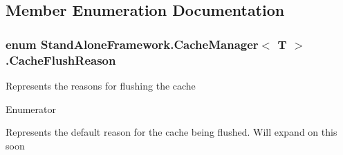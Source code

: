 \subsection{Member Enumeration Documentation}
\hypertarget{class_stand_alone_framework_1_1_cache_manager_3_01_t_01_4_ad524db310decad748ac932dfd557e529}{
\subsubsection[{Cache\+Flush\+Reason}]{\setlength{\rightskip}{0pt plus 5cm}enum Stand\+Alone\+Framework.\+Cache\+Manager$<$ T $>$.{\bf Cache\+Flush\+Reason}\hspace{0.3cm}{\ttfamily [protected]}}}\label{class_stand_alone_framework_1_1_cache_manager_3_01_t_01_4_ad524db310decad748ac932dfd557e529}


Represents the reasons for flushing the cache 

\begin{Desc}
\item[Enumerator]\par
\begin{description}
\item[{\em 
\hypertarget{class_stand_alone_framework_1_1_cache_manager_3_01_t_01_4_ad524db310decad748ac932dfd557e529a7a1920d61156abc05a60135aefe8bc67}{Default}\label{class_stand_alone_framework_1_1_cache_manager_3_01_t_01_4_ad524db310decad748ac932dfd557e529a7a1920d61156abc05a60135aefe8bc67}
}]Represents the default reason for the cache being flushed. Will expand on this soon \end{description}
\end{Desc}


